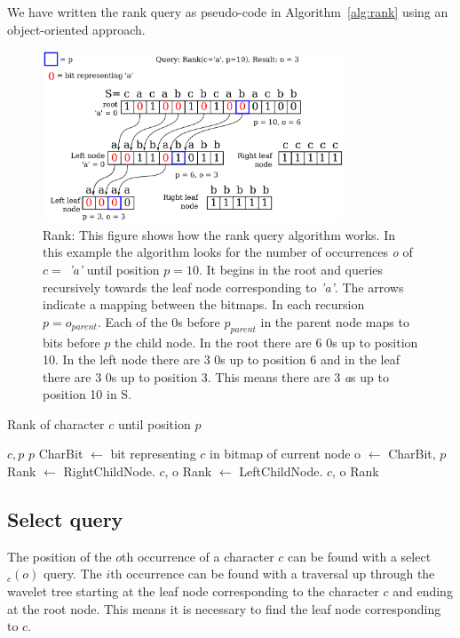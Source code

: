 We have written the rank query as pseudo-code in Algorithm~\ref{alg:rank} using an object-oriented approach.

\begin{figure}
\center \includegraphics[width=0.8\textwidth]{RankDrawing}
\caption{Rank: This figure shows how the rank query algorithm works. 
In this example the algorithm looks for the number of occurrences \textit{o} of $c = $ \textit{'a'} until position $p = 10$.
It begins in the root and queries recursively towards the leaf node corresponding to \textit{'a'}.
The arrows indicate a mapping between the bitmaps.
In each recursion $p = o_{parent}$.
Each of the 0s before $p_{parent}$ in the parent node maps to bits before $p$ the child node.
In the root there are 6 0s up to position 10. 
In the left node there are 3 0s up to position 6
and in the leaf there are 3 0s up to position 3. This means there are 3 \textit{a}s up to position 10 in S.}
\label{fig:RankDrawing}
\end{figure}

\begin{algorithm}
\caption{Rank of character $c$ until position $p$}
\label{alg:rank}
\begin{algorithmic} 
 {$c, p$}
\State \Return $p$
\EndIf
\State CharBit $\gets$ bit representing $c$ in bitmap of current node
\State o $\gets$  {CharBit, $p$}
	\State Rank $\gets$ RightChildNode. {$c$, o}
\Else
	\State Rank $\gets$ LeftChildNode. {$c$, o}
\EndIf
\State \Return Rank
\EndFunction
\end{algorithmic}
\end{algorithm}


\subsection{Select query}
\label{sec:selectDescription}
The position of the $o$th occurrence of a character $c$ can be found with a select$_c(o)$ query.
The $i$th occurrence can be found with a traversal up through the wavelet tree starting at the leaf node corresponding to the character $c$ and ending at the root node.
This means it is necessary to find the leaf node corresponding to $c$.

